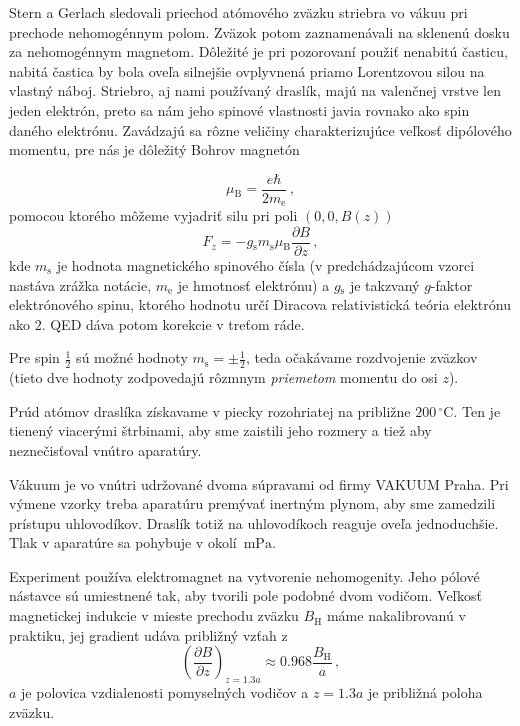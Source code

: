 \documentclass[a4paper, 10pt]{article}
\newcommand{\unit}[1]{\ensuremath{\, \mathrm{#1}}}
\newcommand{\di}[1]{\ensuremath{_\mathrm{#1}}}
\begin{document}
Stern a Gerlach sledovali priechod atómového zväzku striebra vo vákuu pri prechode nehomogénnym polom. Zväzok potom zaznamenávali na sklenenú dosku za nehomogénnym magnetom. Dôležité je pri pozorovaní použiť nenabitú časticu, nabitá častica by bola oveľa silnejšie ovplyvnená priamo Lorentzovou silou na vlastný náboj. Striebro, aj nami používaný draslík, majú na valenčnej vrstve len jeden elektrón, preto sa nám jeho spinové vlastnosti javia rovnako ako spin daného elektrónu. Zavádzajú sa rôzne veličiny charakterizujúce veľkosť dipólového momentu, pre nás je dôležitý Bohrov magnetón

\begin{equation}
\label{eq:teor:bohrov_magneton}
\mu\di B = \frac{e\hbar}{2m\di e}\,,
\end{equation}
pomocou ktorého môžeme vyjadriť silu pri poli $(0, 0, B(z))$
\begin{equation}
\label{eq:teor:sila}
F_z = -g\di s m\di s \mu\di B \frac{\partial B}{\partial z}\,,
\end{equation}
kde $m\di s$ je hodnota magnetického spinového čísla (v predchádzajúcom vzorci nastáva zrážka notácie, $m\di e$ je hmotnosť elektrónu) a $g\di s$ je takzvaný $g$-faktor elektrónového spinu, ktorého hodnotu určí Diracova relativistická teória elektrónu ako $2$. QED dáva potom korekcie v treťom ráde.

Pre spin $\frac 12$ sú možné hodnoty $m\di s = \pm \frac 12$, teda očakávame rozdvojenie zväzkov (tieto dve hodnoty zodpovedajú rôzmnym \emph{priemetom} momentu do osi $z$). 

Prúd atómov draslíka získavame v piecky rozohriatej na približne $200\unit{^\circ C}$. Ten je tienený viacerými štrbinami, aby sme zaistili jeho rozmery a tiež aby neznečisťoval vnútro aparatúry.

Vákuum je vo vnútri udržované dvoma súpravami od firmy VAKUUM Praha. Pri výmene vzorky treba aparatúru premývať inertným plynom, aby sme zamedzili prístupu uhlovodíkov. Draslík totiž na uhlovodíkoch reaguje oveľa jednoduchšie. Tlak v aparatúre sa pohybuje v okolí $\unit{mPa}$.

Experiment používa elektromagnet na vytvorenie nehomogenity. Jeho pólové nástavce sú umiestnené tak, aby tvorili pole podobné dvom vodičom. Veľkosť magnetickej indukcie v mieste prechodu zväzku $B\di H$ máme nakalibrovanú v praktiku, jej gradient udáva približný vzťah z \cite{stud}
\begin{equation}
\label{eq:teor:gradient}
\left(\frac{\partial B}{\partial z}\right)_{z = 1.3 a} \approx 0.968 \frac{B\di H}{a}\,,
\end{equation}
$a$ je polovica vzdialenosti pomyselných vodičov a $z=1.3 a$ je približná poloha zväzku.
\end{document}
